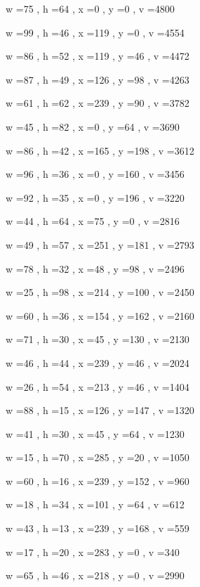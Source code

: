 \documentclass[11pt]{article}
\begin{document}
w =75 , h =64 , x =0 , y =0 , v =4800
\par
w =99 , h =46 , x =119 , y =0 , v =4554
\par
w =86 , h =52 , x =119 , y =46 , v =4472
\par
w =87 , h =49 , x =126 , y =98 , v =4263
\par
w =61 , h =62 , x =239 , y =90 , v =3782
\par
w =45 , h =82 , x =0 , y =64 , v =3690
\par
w =86 , h =42 , x =165 , y =198 , v =3612
\par
w =96 , h =36 , x =0 , y =160 , v =3456
\par
w =92 , h =35 , x =0 , y =196 , v =3220
\par
w =44 , h =64 , x =75 , y =0 , v =2816
\par
w =49 , h =57 , x =251 , y =181 , v =2793
\par
w =78 , h =32 , x =48 , y =98 , v =2496
\par
w =25 , h =98 , x =214 , y =100 , v =2450
\par
w =60 , h =36 , x =154 , y =162 , v =2160
\par
w =71 , h =30 , x =45 , y =130 , v =2130
\par
w =46 , h =44 , x =239 , y =46 , v =2024
\par
w =26 , h =54 , x =213 , y =46 , v =1404
\par
w =88 , h =15 , x =126 , y =147 , v =1320
\par
w =41 , h =30 , x =45 , y =64 , v =1230
\par
w =15 , h =70 , x =285 , y =20 , v =1050
\par
w =60 , h =16 , x =239 , y =152 , v =960
\par
w =18 , h =34 , x =101 , y =64 , v =612
\par
w =43 , h =13 , x =239 , y =168 , v =559
\par
w =17 , h =20 , x =283 , y =0 , v =340
\par
w =65 , h =46 , x =218 , y =0 , v =2990
\par
\newpage
\end{document}
